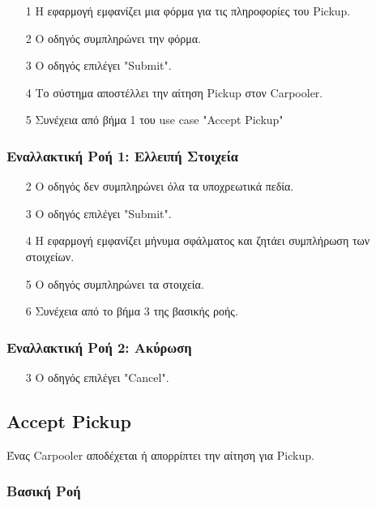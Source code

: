 \begin{enumerate}
    \item[1] Η εφαρμογή εμφανίζει μια φόρμα για τις πληροφορίες του Pickup.
    \item[2] Ο οδηγός συμπληρώνει την φόρμα.
    \item[3] Ο οδηγός επιλέγει "Submit".
    \item[4] Το σύστημα αποστέλλει την αίτηση Pickup στον Carpooler.
    \item[5] Συνέχεια από βήμα 1 του use case "Accept Pickup"
\end{enumerate}

\subsubsection{Εναλλακτική Ροή 1: Ελλειπή Στοιχεία}

\begin{enumerate}
    \item[2] Ο οδηγός δεν συμπληρώνει όλα τα υποχρεωτικά πεδία.
    \item[3] Ο οδηγός επιλέγει "Submit".
    \item[4] Η εφαρμογή εμφανίζει μήνυμα σφάλματος και ζητάει συμπλήρωση των στοιχείων.
    \item[5] Ο οδηγός συμπληρώνει τα στοιχεία.
    \item[6] Συνέχεια από το βήμα 3 της βασικής ροής.
\end{enumerate}

\subsubsection{Εναλλακτική Ροή 2: Ακύρωση}

\begin{enumerate}
    \item[3] Ο οδηγός επιλέγει "Cancel".
\end{enumerate}

\subsection{Accept Pickup}
\label{uc:accept-pickup}

Ένας Carpooler αποδέχεται ή απορρίπτει την αίτηση για Pickup.

\subsubsection{Βασική Ροή}

